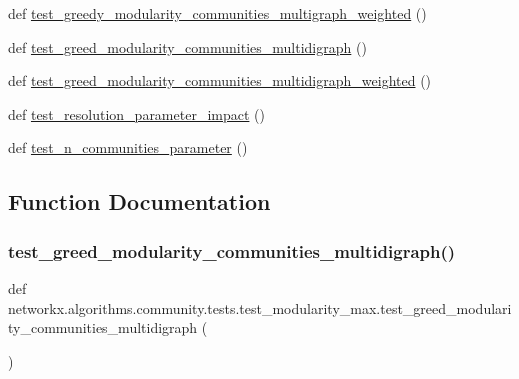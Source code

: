 \begin{DoxyCompactItemize}
\item 
def \hyperlink{namespacenetworkx_1_1algorithms_1_1community_1_1tests_1_1test__modularity__max_a151c0046a256571a4917308260356dfd}{test\+\_\+greedy\+\_\+modularity\+\_\+communities\+\_\+multigraph\+\_\+weighted} ()
\item 
def \hyperlink{namespacenetworkx_1_1algorithms_1_1community_1_1tests_1_1test__modularity__max_aa9b8a208691373b59d494f4519b8d158}{test\+\_\+greed\+\_\+modularity\+\_\+communities\+\_\+multidigraph} ()
\item 
def \hyperlink{namespacenetworkx_1_1algorithms_1_1community_1_1tests_1_1test__modularity__max_a68ea0c97bd6d19da38836483da868914}{test\+\_\+greed\+\_\+modularity\+\_\+communities\+\_\+multidigraph\+\_\+weighted} ()
\item 
def \hyperlink{namespacenetworkx_1_1algorithms_1_1community_1_1tests_1_1test__modularity__max_a93a2f8dd6096b4874a1623cad04ba4c1}{test\+\_\+resolution\+\_\+parameter\+\_\+impact} ()
\item 
def \hyperlink{namespacenetworkx_1_1algorithms_1_1community_1_1tests_1_1test__modularity__max_a40ae407097f9521bea3560f6a4962a54}{test\+\_\+n\+\_\+communities\+\_\+parameter} ()
\end{DoxyCompactItemize}


\subsection{Function Documentation}
\mbox{\label{namespacenetworkx_1_1algorithms_1_1community_1_1tests_1_1test__modularity__max_aa9b8a208691373b59d494f4519b8d158}} 
\subsubsection{\texorpdfstring{test\+\_\+greed\+\_\+modularity\+\_\+communities\+\_\+multidigraph()}{test\_greed\_modularity\_communities\_multidigraph()}}
{\footnotesize\ttfamily def networkx.\+algorithms.\+community.\+tests.\+test\+\_\+modularity\+\_\+max.\+test\+\_\+greed\+\_\+modularity\+\_\+communities\+\_\+multidigraph (\begin{DoxyParamCaption}{ }\end{DoxyParamCaption})}

